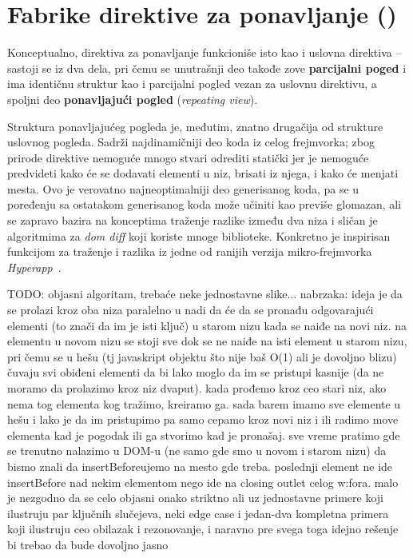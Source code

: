 \section{Fabrike direktive za ponavljanje ()}
\label{sec:fabrike-direktive-za-ponavljanje}

Konceptualno, direktiva za ponavljanje funkcioniše isto kao i uslovna direktiva -- sastoji se iz dva dela, pri čemu se unutrašnji deo takođe zove \textbf{parcijalni poged} i ima identičnu struktur kao i parcijalni pogled vezan za uslovnu direktivu, a spoljni deo \textbf{ponavljajući pogled} (\textsl{repeating view}).

Struktura ponavljajućeg pogleda je, međutim, znatno drugačija od strukture uslovnog pogleda.
Sadrži najdinamičniji deo koda iz celog frejmvorka; zbog prirode direktive nemoguće mnogo stvari odrediti statički jer je nemoguće predvideti kako će se dodavati elementi u niz, brisati iz njega, i kako će menjati mesta.
Ovo je verovatno najneoptimalniji deo generisanog koda, pa se u poređenju sa ostatakom generisanog koda može učiniti kao previše glomazan, ali se zapravo bazira na konceptima traženje razlike između dva niza i sličan je algoritmima za \textit{dom diff} koji koriste mnoge biblioteke.
Konkretno je inspirisan funkcijom za traženje i  razlika iz jedne od ranijih verzija mikro-frejmvorka \textit{Hyperapp}~\cite{hyperapp:patch}.

TODO: objasni algoritam, trebaće neke jednostavne slike... nabrzaka: ideja je da se prolazi kroz oba niza paralelno u nadi da će da se pronađu odgovarajući elementi (to znači da im je isti ključ) u starom nizu kada se naiđe na novi niz. na elementu u novom nizu se stoji sve dok se ne naiđe na isti element u starom nizu, pri čemu se u hešu (tj javaskript objektu što nije baš O(1) ali je dovoljno blizu) čuvaju svi obiđeni elementi da bi lako moglo da im se pristupi kasnije (da ne moramo da prolazimo kroz niz dvaput). kada prođemo kroz ceo stari niz, ako nema tog elementa kog tražimo, kreiramo ga. sada barem imamo sve elemente u hešu i lako je da im pristupimo pa samo cepamo kroz novi niz i ili radimo move elementa kad je pogodak ili ga stvorimo kad je pronašaj. sve vreme pratimo gde se trenutno nalazimo u DOM-u (ne samo gde smo u novom i starom nizu) da bismo znali da insertBeforeujemo na mesto gde treba. poslednji element ne ide insertBefore nad nekim elementom nego ide na closing outlet celog w:fora. malo je nezgodno da se celo objasni onako striktno ali uz jednostavne primere koji ilustruju par ključnih slučejeva, neki edge case i jedan-dva kompletna primera koji ilustruju ceo obilazak i rezonovanje, i naravno pre svega toga idejno rešenje bi trebao da bude dovoljno jasno
